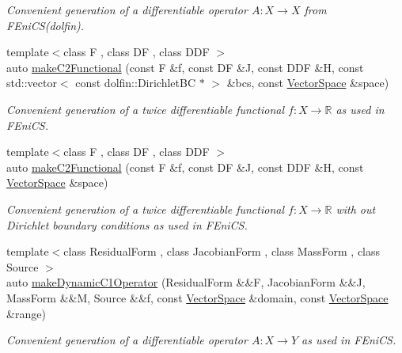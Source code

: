 \begin{DoxyCompactItemize}
\begin{DoxyCompactList}\small\item\em Convenient generation of a differentiable operator $A: X\rightarrow X$ from F\+Eni\+C\+S(dolfin). \end{DoxyCompactList}\item 
{\footnotesize template$<$class F , class D\+F , class D\+D\+F $>$ }\\auto \hyperlink{group__FenicsGroup_ga78db716003d17d5f781dfcb13a183519_ga78db716003d17d5f781dfcb13a183519}{make\+C2\+Functional} (const F \&f, const D\+F \&J, const D\+D\+F \&H, const std\+::vector$<$ const dolfin\+::\+Dirichlet\+B\+C $\ast$ $>$ \&bcs, const \hyperlink{classSpacy_1_1VectorSpace}{Vector\+Space} \&space)
\begin{DoxyCompactList}\small\item\em Convenient generation of a twice differentiable functional $f: X\rightarrow \mathbb{R}$ as used in F\+Eni\+C\+S. \end{DoxyCompactList}\item 
{\footnotesize template$<$class F , class D\+F , class D\+D\+F $>$ }\\auto \hyperlink{group__FenicsGroup_ga4e69e5b7265feac21653bfc2da725a75_ga4e69e5b7265feac21653bfc2da725a75}{make\+C2\+Functional} (const F \&f, const D\+F \&J, const D\+D\+F \&H, const \hyperlink{classSpacy_1_1VectorSpace}{Vector\+Space} \&space)
\begin{DoxyCompactList}\small\item\em Convenient generation of a twice differentiable functional $f: X\rightarrow \mathbb{R}$ with out Dirichlet boundary conditions as used in F\+Eni\+C\+S. \end{DoxyCompactList}\item 
{\footnotesize template$<$class Residual\+Form , class Jacobian\+Form , class Mass\+Form , class Source $>$ }\\auto \hyperlink{group__FenicsGroup_ga70d8ba7fecc2caba97343f5506340602_ga70d8ba7fecc2caba97343f5506340602}{make\+Dynamic\+C1\+Operator} (Residual\+Form \&\&F, Jacobian\+Form \&\&J, Mass\+Form \&\&M, Source \&\&f, const \hyperlink{classSpacy_1_1VectorSpace}{Vector\+Space} \&domain, const \hyperlink{classSpacy_1_1VectorSpace}{Vector\+Space} \&range)
\begin{DoxyCompactList}\small\item\em Convenient generation of a differentiable operator $A: X\rightarrow Y$ as used in F\+Eni\+C\+S. \end{DoxyCompactList}\item 

\end{DoxyCompactItemize}
